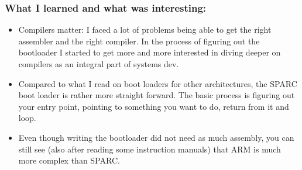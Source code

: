 \documentclass{beamer}
\begin{document}
\begin{frame}
    \frametitle{What I learned and what was interesting:}
    \begin{itemize}
        \item Compilers matter: I faced a lot of problems being able to get the right assembler and the right compiler. In the process of figuring out the bootloader I started to get more and more interested in diving deeper on compilers as an integral part of systems dev.
        \item Compared to what I read on boot loaders for other architectures, the SPARC boot loader is rather more straight forward. The basic process is figuring out your entry point, pointing to something you want to do, return from it and loop.
        \item Even though writing the bootloader did not need as much assembly, you can still see (also after reading some instruction manuals) that ARM is much more complex than SPARC.
    \end{itemize}
\end{frame}
\end{document}
